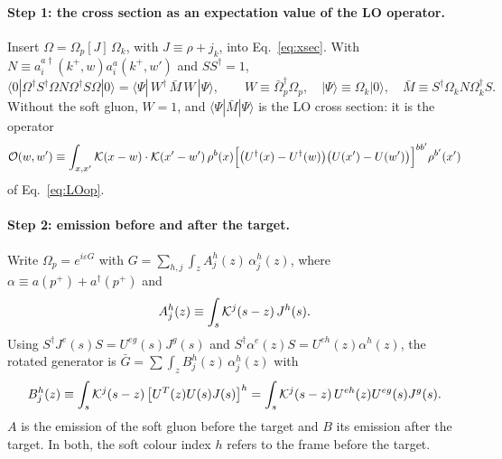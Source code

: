 \paragraph*{Step 1: the cross section as an expectation value of the LO operator.} Insert $\Omega=\Omega_p[J]\,\Omega_k$, with $J\equiv\rho+j_k$, into Eq.~\eqref{eq:xsec}. With $N\equiv a^{a\dagger}_i(k^+,w)a^a_i(k^+,w')$ and $SS^\dagger=1$,
\begin{equation}
\langle0|\Omega^\dagger S^\dagger\Omega N\Omega^\dagger S\Omega|0\rangle=\langle\Psi|\,W^\dagger\,\bar M\,W\,|\Psi\rangle,\qquad W\equiv\bar\Omega_p^\dagger\Omega_p,\quad|\Psi\rangle\equiv\Omega_k|0\rangle,\quad\bar M\equiv S^\dagger\Omega_kN\Omega_k^\dagger S.
\label{eq:step1}
\end{equation}
Without the soft gluon, $W=1$, and $\langle\Psi|\bar M|\Psi\rangle$ is the LO cross section: it is the operator
\begin{equation}
\mathcal{O}(w,w')\equiv\int_{x,x'}\mathcal{K}(x-w)\cdot\mathcal{K}(x'-w')\,\rho^b(x)\Big[\big(U^{\dagger}(x)-U^{\dagger}(w)\big)\big(U(x')-U(w')\big)\Big]^{bb'}\rho^{b'}(x')
\label{eq:Oop}
\end{equation}
of Eq.~\eqref{eq:LOop}.

\paragraph*{Step 2: emission before and after the target.} Write $\Omega_p=e^{i\varepsilon G}$ with $G=\sum_{h,j}\int_zA^h_j(z)\,\alpha^h_j(z)$, where $\alpha\equiv a(p^+)+a^\dagger(p^+)$ and
\begin{equation}
A^h_j(z)\equiv\int_s\mathcal{K}^j(s-z)\,J^h(s).
\end{equation}
Using $S^\dagger J^e(s)S=U^{eg}(s)J^g(s)$ and $S^\dagger\alpha^e(z)S=U^{eh}(z)\alpha^h(z)$, the rotated generator is $\bar G=\sum\int_zB^h_j(z)\,\alpha^h_j(z)$ with
\begin{equation}
B^h_j(z)\equiv\int_s\mathcal{K}^j(s-z)\,\big[U^T(z)U(s)J(s)\big]^h=\int_s\mathcal{K}^j(s-z)\,U^{eh}(z)U^{eg}(s)J^g(s).
\end{equation}
$A$ is the emission of the soft gluon before the target and $B$ its emission after the target. In both, the soft colour index $h$ refers to the frame before the target.

